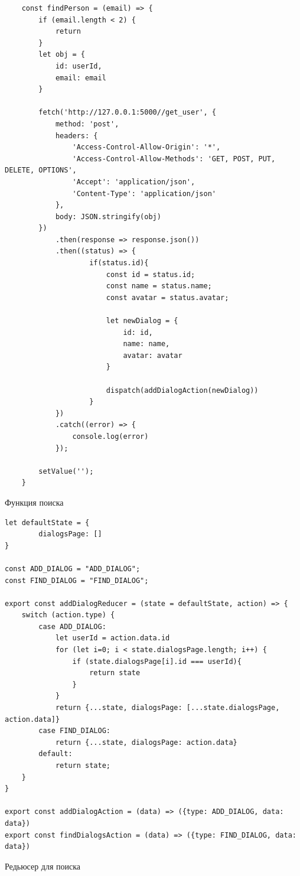 \documentclass[14pt,final]{report}
\begin{document}
\begin{listing}[!h]
\begin{verbatim}
    const findPerson = (email) => {
        if (email.length < 2) {
            return
        }
        let obj = {
            id: userId,
            email: email
        }
        
        fetch('http://127.0.0.1:5000//get_user', {
            method: 'post',
            headers: {
                'Access-Control-Allow-Origin': '*',
                'Access-Control-Allow-Methods': 'GET, POST, PUT, DELETE, OPTIONS',
                'Accept': 'application/json',
                'Content-Type': 'application/json'
            },
            body: JSON.stringify(obj)
        })
            .then(response => response.json())
            .then((status) => {
                    if(status.id){
                        const id = status.id;
                        const name = status.name;
                        const avatar = status.avatar;

                        let newDialog = {
                            id: id,
                            name: name,
                            avatar: avatar
                        }

                        dispatch(addDialogAction(newDialog))
                    }
            })
            .catch((error) => {
                console.log(error)
            });

        setValue('');
    }
\end{verbatim}
\caption{Функция поиска}
\label{search}
\end{listing}

\begin{listing}[!h]
\begin{verbatim}
let defaultState = {
        dialogsPage: []
}

const ADD_DIALOG = "ADD_DIALOG";
const FIND_DIALOG = "FIND_DIALOG";

export const addDialogReducer = (state = defaultState, action) => {
    switch (action.type) {
        case ADD_DIALOG:
            let userId = action.data.id
            for (let i=0; i < state.dialogsPage.length; i++) {
                if (state.dialogsPage[i].id === userId){
                    return state
                }
            }
            return {...state, dialogsPage: [...state.dialogsPage, action.data]}
        case FIND_DIALOG:
            return {...state, dialogsPage: action.data}
        default:
            return state;
    }
}

export const addDialogAction = (data) => ({type: ADD_DIALOG, data: data})
export const findDialogsAction = (data) => ({type: FIND_DIALOG, data: data})
\end{verbatim}
\caption{Редьюсер для поиска}
\label{searchReducer}
\end{listing}
\end{document}
